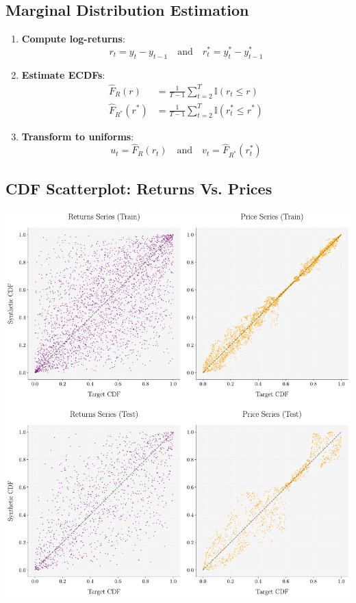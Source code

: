 \documentclass[
  letterpaper,
  DIV=11,
  numbers=noendperiod]{scrartcl}
\begin{document}
\subsection{Marginal Distribution
Estimation}\label{marginal-distribution-estimation}

\begin{enumerate}
\def\labelenumi{\arabic{enumi}.}
\item
  \textbf{Compute log-returns}: \[
  r_t = y_t - y_{t-1} \quad \text{and} \quad r_t^* = y_t^* - y_{t-1}^* 
  \]
\item
  \textbf{Estimate ECDFs}: \begin{align}
  \hat{F}_{R}(r) &= \frac{1}{T-1} \sum_{t=2}^T \mathbb{I}(r_t \leq r)
  \\
  \hat{F}_{R^*}(r^*) &= \frac{1}{T-1} \sum_{t=2}^T \mathbb{I}(r_t^* \leq r^*)
  \end{align}
\item
  \textbf{Transform to uniforms}: \[
  u_t = \hat{F}_R(r_t) \quad \text{and} \quad v_t = \hat{F}_{R^*}(r_t^*)
  \]
\end{enumerate}

\subsection{CDF Scatterplot: Returns Vs.
Prices}\label{cdf-scatterplot-returns-vs.-prices}

\begin{center}
\includegraphics[width=1\linewidth,height=\textheight,keepaspectratio]{simple_Presentation_files/mediabag/images/converted/CDF_scatter_comparison.pdf}
\end{center}
\end{document}
